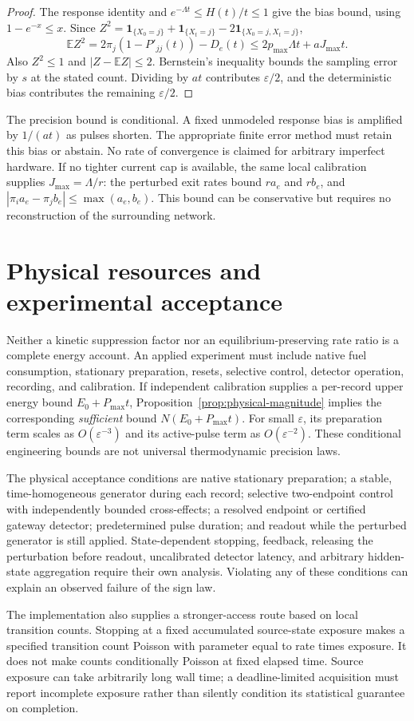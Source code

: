 \begin{proof}
The response identity and $e^{-\Lambda t}\le H(t)/t\le1$ give the
bias bound, using $1-e^{-x}\le x$.  Since
$Z^2=\mathbf 1_{\{X_0=j\}}+\mathbf 1_{\{X_t=j\}}
       -2\mathbf 1_{\{X_0=j,X_t=j\}}$,
\[
 \mathbb EZ^2=2\pi_j(1-P'_{jj}(t))-D_e(t)
 \le2p_{\max}\Lambda t+aJ_{\max}t.
\]
Also $Z^2\le1$ and $|Z-\mathbb EZ|\le2$.
Bernstein's inequality bounds the sampling error by $s$ at the stated
count.  Dividing by $at$ contributes $\varepsilon/2$, and the
deterministic bias contributes the remaining $\varepsilon/2$.
\end{proof}

The precision bound is conditional.  A fixed unmodeled response bias
is amplified by $1/(at)$ as pulses shorten.  The appropriate finite
error method must retain this bias or abstain.  No rate of convergence
is claimed for arbitrary imperfect hardware.
If no tighter current cap is available, the same local calibration
supplies $J_{\max}=\Lambda/r$: the perturbed exit rates bound
$ra_e$ and $rb_e$, and
$|\pi_i a_e-\pi_j b_e|\le\max(a_e,b_e)$.  This bound can be
conservative but requires no reconstruction of the surrounding network.

\section{Physical resources and experimental acceptance}

Neither a kinetic suppression factor nor an equilibrium-preserving
rate ratio is a complete energy account.  An applied experiment must
include native fuel consumption, stationary preparation, resets,
selective control, detector operation, recording, and calibration.
If independent calibration supplies a per-record upper energy bound
$E_0+P_{\max}t$, Proposition~\ref{prop:physical-magnitude} implies
the corresponding \emph{sufficient} bound
$N(E_0+P_{\max}t)$.  For small $\varepsilon$, its preparation term
scales as $O(\varepsilon^{-3})$ and its active-pulse term as
$O(\varepsilon^{-2})$.  These conditional engineering bounds are not
universal thermodynamic precision laws.

The physical acceptance conditions are native stationary preparation;
a stable, time-homogeneous generator during each record; selective
two-endpoint control with independently bounded cross-effects; a
resolved endpoint or certified gateway detector; predetermined pulse
duration; and readout while the perturbed generator is still applied.
State-dependent stopping, feedback, releasing the perturbation before
readout, uncalibrated detector latency, and arbitrary hidden-state
aggregation require their own analysis.  Violating any of these
conditions can explain an observed failure of the sign law.

The implementation also supplies a stronger-access route based on
local transition counts.  Stopping at a fixed accumulated source-state
exposure makes a specified transition count Poisson with parameter
equal to rate times exposure.  It does not make counts conditionally
Poisson at fixed elapsed time.  Source exposure can take arbitrarily
long wall time; a deadline-limited acquisition must report incomplete
exposure rather than silently condition its statistical guarantee on
completion.
